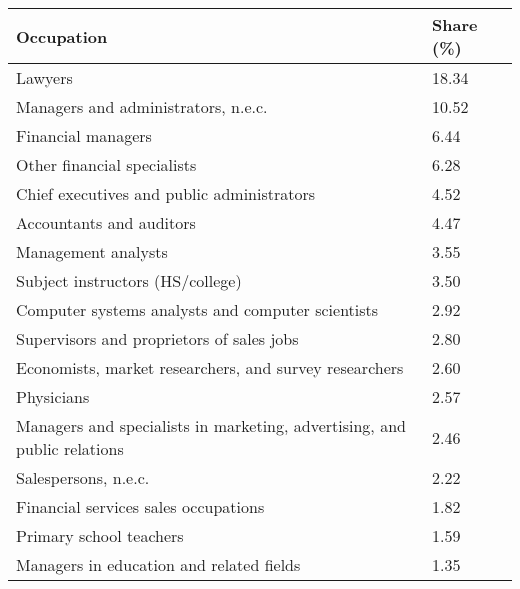 

\begin{tabular}[t]{ll}
\toprule
Occupation & Share (\%)\\
\midrule
Lawyers & 18.34\\
Managers and administrators, n.e.c. & 10.52\\
Financial managers & 6.44\\
Other financial specialists & 6.28\\
Chief executives and public administrators & 4.52\\
Accountants and auditors & 4.47\\
Management analysts & 3.55\\
Subject instructors (HS/college) & 3.50\\
Computer systems analysts and computer scientists & 2.92\\
Supervisors and proprietors of sales jobs & 2.80\\
Economists, market researchers, and survey researchers & 2.60\\
Physicians & 2.57\\
Managers and specialists in marketing, advertising, and public relations & 2.46\\
Salespersons, n.e.c. & 2.22\\
Financial services sales occupations & 1.82\\
Primary school teachers & 1.59\\
Managers in education and related fields & 1.35\\
\bottomrule
\end{tabular}


